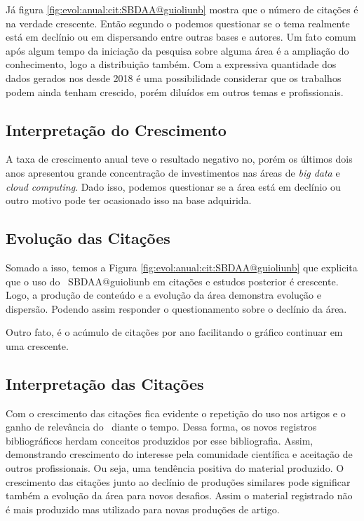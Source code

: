 Já figura \ref{fig:evol:anual:cit:SBDAA@guioliunb} mostra que o número de citações é na verdade crescente. Então segundo o podemos questionar se o tema realmente está em declínio ou em dispersando entre outras bases e autores. Um fato comum após algum tempo da iniciação da pesquisa sobre alguma área é a ampliação do conhecimento, logo a distribuição também. Com a expressiva quantidade dos dados gerados nos desde 2018 é uma possibilidade considerar que os trabalhos podem ainda tenham crescido, porém diluídos em outros temas e profissionais.

\subsection{Interpretação do Crescimento} 

A taxa de crescimento anual teve o resultado negativo no, porém os últimos dois anos apresentou grande concentração de investimentos nas áreas de \textit{big data} e \textit{cloud computing}. Dado isso, podemos questionar se a área está em declínio ou outro motivo pode ter ocasionado isso na base adquirida.

\subsection{Evolução das Citações}

Somado a isso, temos a Figura \ref{fig:evol:anual:cit:SBDAA@guioliunb} que explicita que o uso do \dataset\  SBDAA@guioliunb em citações e estudos posterior é crescente. Logo, a produção de conteúdo e a evolução da área demonstra evolução e dispersão. Podendo assim responder o questionamento sobre o declínio da área.

Outro fato, é o acúmulo de citações por ano facilitando o gráfico continuar em uma crescente.



\subsection{Interpretação das Citações}
Com o crescimento das citações fica evidente o repetição do uso nos artigos e o ganho de relevância do \dataset\ diante o tempo. Dessa forma, os novos registros bibliográficos herdam conceitos produzidos por esse bibliografia. Assim, demonstrando crescimento do interesse pela comunidade científica e aceitação de outros profissionais. Ou seja, uma tendência positiva do material produzido.
O crescimento das citações junto ao declínio de produções similares pode significar também a evolução da área para novos desafios. Assim o material registrado não é mais produzido mas utilizado para novas produções de artigo.

